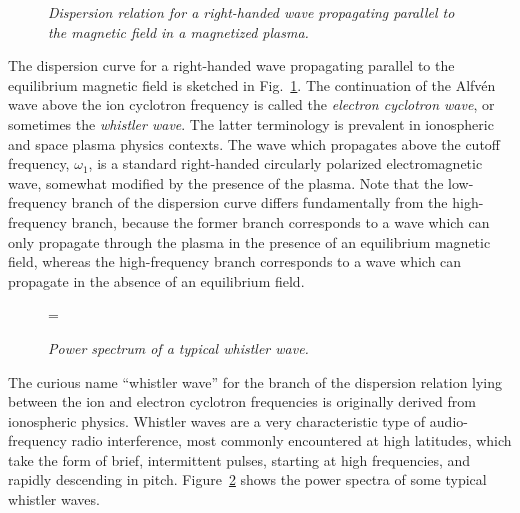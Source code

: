 \begin{figure}
\epsfysize=4in
\centerline{}
\caption{\em Dispersion relation for a right-handed wave propagating
parallel to the magnetic field in a magnetized plasma.}\label{f12}
\end{figure}

The dispersion curve for a right-handed wave propagating parallel to
 the equilibrium
magnetic field is sketched in Fig.~\ref{f12}. The continuation of the Alfv\'{e}n
wave above the ion cyclotron frequency is called the {\em electron cyclotron
wave}, or sometimes  the {\em whistler wave}. The latter terminology is prevalent
in ionospheric and space plasma physics contexts. The wave which propagates
above the cutoff frequency, $\omega_1$, is a standard right-handed
circularly polarized electromagnetic wave, somewhat modified by the
presence of the plasma. Note that the low-frequency branch of the
dispersion curve differs fundamentally from the high-frequency branch, because
the former branch corresponds to a wave which can only propagate through the
plasma in the presence of an equilibrium magnetic field, whereas the high-frequency
branch corresponds to a wave which can propagate in the absence of an equilibrium
 field.

\begin{figure}
\epsfysize=4in
=\hbox{}
\centerline{}
\caption{\em Power spectrum of a typical whistler wave.}\label{f13}
\end{figure}

The curious name ``whistler wave'' for the branch of the dispersion relation
lying between the ion  and electron cyclotron frequencies is originally
derived from ionospheric physics. Whistler waves are a very characteristic
type  of 
audio-frequency radio interference, most commonly encountered at high
latitudes, which take the form of brief,
intermittent pulses, starting at high frequencies, and rapidly descending in pitch.
Figure~\ref{f13} shows the power spectra of some typical whistler waves. 

